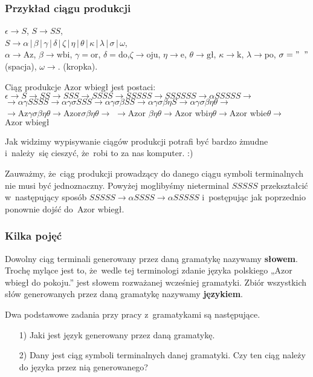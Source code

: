 \documentclass[10pt,t]{beamer}
\begin{document}
\begin{frame}
  \frametitle{Przykład ciągu produkcji}


  $\epsilon \to S$, $S \to SS$, \\
  $S \to \alpha \, | \, \beta \, | \, \gamma \, | \, \delta \, | \, \zeta \, | \, \eta \, | \,
  \theta \, | \, \kappa \, | \, \lambda \, | \, \sigma \, | \, \omega$, \\
  $\alpha \to \text{Az}$, $\beta \to \text{wbi}$, $\gamma = \text{or}$,
  $\delta = \text{do}$,$\zeta \to \text{oju}$, $\eta \to \text{e}$,
  $\theta \to \text{gł}$, $\kappa \to \text{k}$, $\lambda \to \text{po}$,
  $\sigma = "\;\;"$ (spacja), $\omega \to .$ (kropka).

  Ciąg produkcje $\text{Azor wbiegł}$ jest postaci:
  $\epsilon \to S \to SS \to SSS \to SSSS \to SSSSS \to SSSSSS \to \alpha SSSSS \to $
  $\to \alpha\gamma SSSS \to \alpha\gamma\sigma SSS \to \alpha\gamma\sigma\beta SS \to \alpha\gamma\sigma\beta\eta S \to \alpha\gamma\sigma\beta\eta\theta \to $
  $\to \text{Az}\gamma\sigma\beta\eta\theta \to \text{Azor}\sigma\beta\eta\theta \to $
  $\to \text{Azor }\beta\eta\theta \to \text{Azor wbi}\eta\theta \to \text{Azor wbie}\theta \to $
  $\text{Azor wbiegł}$

  Jak widzimy wypisywanie ciągów produkcji potrafi być bardzo żmudne
  i~należy~się cieszyć, że~robi to za nas komputer. :)

  Zauważmy, że~ciąg produkcji prowadzący do danego ciągu symboli
  terminalnych nie musi być jednoznaczny. Powyżej moglibyśmy nieterminal
  $SSSSS$ przekształcić w~następujący sposób
  $SSSSS \to \alpha SSSS \to \alpha SSSSS$ i~postępując jak poprzednio ponownie dojść
  do~$\text{Azor wbiegł}$.

\end{frame}





\begin{frame}
  \frametitle{Kilka pojęć}


  Dowolny ciąg terminali generowany przez daną gramatykę nazywamy
  \textbf{słowem}. Trochę mylące jest to, że~wedle tej terminologi zdanie
  języka polskiego „Azor wbiegł do pokoju.” jest \alert{słowem} rozważanej
  wcześniej gramatyki. Zbiór wszystkich słów generowanych przez daną
  gramatykę nazywamy \textbf{językiem}.

  Dwa podstawowe zadania przy pracy z~gramatykami są następujące.

  \begin{itemize}

  \item[1)] Jaki jest język generowany przez daną gramatykę.

  \item[2)] Dany jest ciąg symboli terminalnych danej gramatyki. Czy ten
    ciąg należy do języka przez nią generowanego?

  \end{itemize}

\end{frame}
\end{document}
